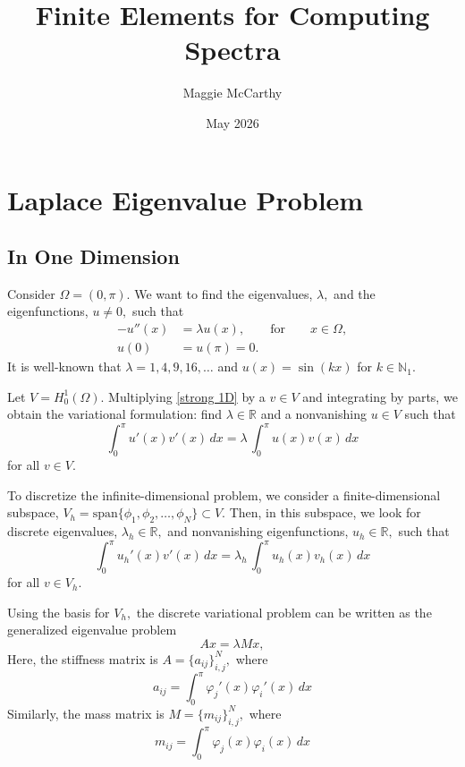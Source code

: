 \documentclass[12pt,a4paper]{article}
\title{Finite Elements for Computing Spectra}
\author{Maggie McCarthy}
\date{May 2026}
\theoremstyle{boldthm}
\theoremstyle{bolddefn}
\begin{document}
\maketitle

\section{Laplace Eigenvalue Problem}

\subsection{In One Dimension}


Consider $\Omega = (0, \pi).$ We want to find the eigenvalues, $\lambda,$ and the eigenfunctions, $u \ne 0,$ such that
\begin{equation}\label{strong 1D}
\begin{aligned}
     -u''(x) &= \lambda u(x), \qquad \text{for} \qquad x \in \Omega,\\
     u(0) &=u(\pi) = 0.
\end{aligned}
\end{equation}
It is well-known that $\lambda = 1, 4, 9, 16, \dots$ and $u(x) = \sin(kx)$ for $k \in \mathbb{N}_1.$


Let $V = H_0^1(\Omega).$ Multiplying \eqref{strong 1D} by a $v \in V$ and integrating by parts, we obtain the variational formulation: find $\lambda \in \mathbb{R}$ and a nonvanishing $u \in V$ such that
\begin{equation}
    \int_{0}^{\pi} u'(x) v'(x) \, dx = \lambda \, \int_0^{\pi} u(x) v(x) \, dx
\end{equation}
for all $v \in V.$

To discretize the infinite-dimensional problem, we consider a finite-dimensional subspace, $V_h = \text{span}\{\phi_1, \phi_2, \dots, \phi_N\} \subset V.$ Then, in this subspace, we look for discrete eigenvalues, $\lambda_h \in \mathbb{R},$ and nonvanishing eigenfunctions, $u_h \in \mathbb{R},$ such that
\begin{equation}
    \int_{0}^{\pi} u_h'(x) v'(x) \, dx = \lambda_h \, \int_0^{\pi} u_h(x) v_h(x) \, dx
\end{equation}
for all $v \in V_h.$

Using the basis for $V_h,$ the discrete variational problem can be written as the generalized eigenvalue problem
$$ Ax = \lambda M x, $$
Here, the stiffness matrix is $A = \{a_{ij}\}_{i,j}^N,$ where
\begin{equation}
a_{ij}
=
\int_0^\pi \varphi_j'(x)\varphi_i'(x)\,dx
\end{equation}
Similarly, the mass matrix is $M = \{m_{ij}\}_{i,j}^N,$ where
\begin{equation}
m_{ij}
=
\int_0^\pi \varphi_j(x)\varphi_i(x)\,dx
\end{equation}
\end{document}
